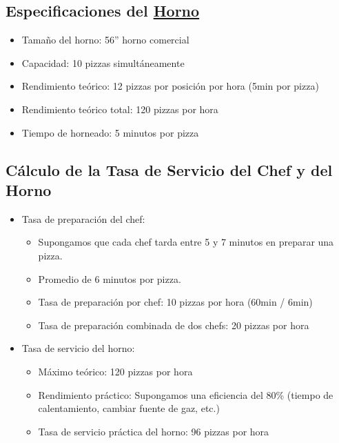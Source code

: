 \documentclass[
]{article}
\providecommand{\tightlist}{%
  \setlength{\itemsep}{0pt}\setlength{\parskip}{0pt}}
\begin{document}
\subsection{\texorpdfstring{Especificaciones del
\href{https://www.fornobravo.com/blog/pizza-oven-size-and-throughput/?srsltid=AfmBOoqfVlB2eAthD4uKjHwTodRZLnPDwe0G9wiqSP5PmHmjBb7xyqpp}{Horno}}{Especificaciones del Horno}}\label{especificaciones-del-horno}

\begin{itemize}
\tightlist
\item
  Tamaño del horno: 56'' horno comercial
\item
  Capacidad: 10 pizzas simultáneamente
\item
  Rendimiento teórico: 12 pizzas por posición por hora (5min por pizza)
\item
  Rendimiento teórico total: 120 pizzas por hora
\item
  Tiempo de horneado: 5 minutos por pizza
\end{itemize}

\subsection{Cálculo de la Tasa de Servicio del Chef y del
Horno}\label{cuxe1lculo-de-la-tasa-de-servicio-del-chef-y-del-horno}

\begin{itemize}
\tightlist
\item
  Tasa de preparación del chef:

  \begin{itemize}
  \tightlist
  \item
    Supongamos que cada chef tarda entre 5 y 7 minutos en preparar una
    pizza.
  \item
    Promedio de 6 minutos por pizza.
  \item
    Tasa de preparación por chef: 10 pizzas por hora (60min / 6min)
  \item
    Tasa de preparación combinada de dos chefs: 20 pizzas por hora
  \end{itemize}
\item
  Tasa de servicio del horno:

  \begin{itemize}
  \tightlist
  \item
    Máximo teórico: 120 pizzas por hora
  \item
    Rendimiento práctico: Supongamos una eficiencia del 80\% (tiempo de
    calentamiento, cambiar fuente de gaz, etc.)
  \item
    Tasa de servicio práctica del horno: 96 pizzas por hora
  \end{itemize}
\end{itemize}
\end{document}
